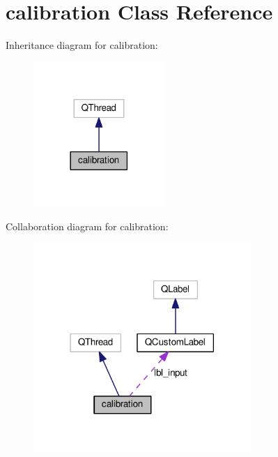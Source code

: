 \hypertarget{classcalibration}{}\section{calibration Class Reference}
\label{classcalibration}


Inheritance diagram for calibration\+:
\nopagebreak
\begin{figure}[H]
\begin{center}
\leavevmode
\includegraphics[width=141pt]{classcalibration__inherit__graph}
\end{center}
\end{figure}


Collaboration diagram for calibration\+:
\nopagebreak
\begin{figure}[H]
\begin{center}
\leavevmode
\includegraphics[width=234pt]{classcalibration__coll__graph}
\end{center}
\end{figure}
